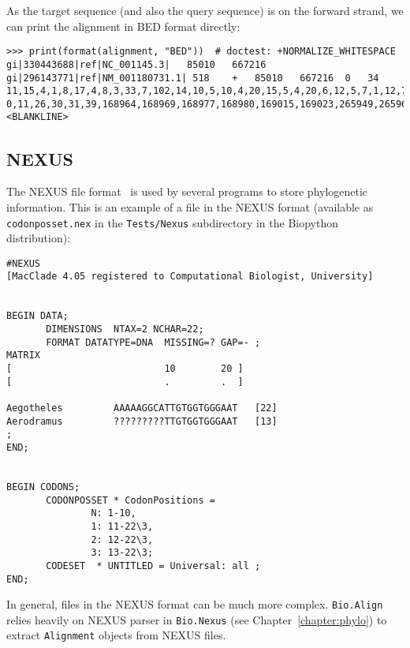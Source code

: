 As the target sequence (and also the query sequence) is on the forward strand, we can print the alignment in BED format directly:
\begin{verbatim}
>>> print(format(alignment, "BED"))  # doctest: +NORMALIZE_WHITESPACE
gi|330443688|ref|NC_001145.3|	85010	667216	gi|296143771|ref|NM_001180731.1| 518	+	85010	667216	0	34	11,15,4,1,8,17,4,8,3,33,7,102,14,10,5,10,4,20,15,5,4,20,6,12,5,7,1,12,75,6,4,2,3,41,	0,11,26,30,31,39,168964,168969,168977,168980,169015,169023,265949,265965,265975,265982,265992,265997,266017,266033,266038,388160,388185,582030,582044,582049,582058,582060,582072,582147,582153,582158,582161,582165,
<BLANKLINE>
\end{verbatim}


\subsection{NEXUS}
\label{subsec:align_nexus}

The NEXUS file format~\cite{maddison1997} is used by several programs to store phylogenetic information. This is an example of a file in the NEXUS format (available as \verb|codonposset.nex| in the \verb|Tests/Nexus| subdirectory in the Biopython distribution):
\begin{verbatim}
#NEXUS
[MacClade 4.05 registered to Computational Biologist, University]


BEGIN DATA;
       DIMENSIONS  NTAX=2 NCHAR=22;
       FORMAT DATATYPE=DNA  MISSING=? GAP=- ;
MATRIX
[                           10        20 ]
[                           .         .  ]

Aegotheles         AAAAAGGCATTGTGGTGGGAAT   [22]
Aerodramus         ?????????TTGTGGTGGGAAT   [13]
;
END;


BEGIN CODONS;
       CODONPOSSET * CodonPositions =
               N: 1-10,
               1: 11-22\3,
               2: 12-22\3,
               3: 13-22\3;
       CODESET  * UNTITLED = Universal: all ;
END;
\end{verbatim}
In general, files in the NEXUS format can be much more complex. \verb|Bio.Align| relies heavily on NEXUS parser in \verb|Bio.Nexus| (see Chapter~\ref{chapter:phylo}) to extract \verb|Alignment| objects from NEXUS files.

